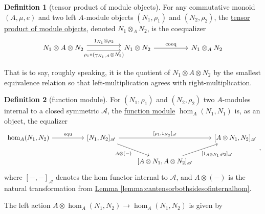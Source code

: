 \documentclass[a4paper,10pt]{scrreprt}
\newcommand{\defn}[1]{\ul{#1}}
\theoremstyle{definition}
\newtheorem{definition}{Definition}[section]
\theoremstyle{plain}
\theoremstyle{remark}
\begin{document}
\begin{definition}[tensor product of module objects]
  \label{def:tensorproductofmoduleobjects}
  For any commutative monoid $(A, \mu, e)$ and two left $A$-module objects $(N_{1}, \rho_{1})$ and $(N_{2}, \rho_{2})$, the \defn{tensor product of module objects}, denoted $N_{1} \otimes_{A} N_{2}$, is the coequalizer
  \begin{equation*}
    \begin{tikzcd}[column sep=huge]
      N_{1} \otimes A \otimes N_{2}
      \arrow[r, shift left=1.5, "1_{N_{1}} \otimes \rho_{2}"]
      \arrow[r, shift right=1.5, swap, "{\rho_{1} \circ (\gamma_{N_{1}, A} \otimes N_{2})}"]
      & N_{1} \otimes N_{2}
      \arrow[r, "\mathrm{coeq}"]
      & N_{1} \otimes_{A} N_{2}
    \end{tikzcd}
  \end{equation*}

  That is to say, roughly speaking, it is the quotient of $N_{1} \otimes A \otimes N_{2}$ by the smallest equivalence relation so that left-multiplication agrees with right-multiplication.
\end{definition}

\begin{definition}[function module]
  \label{def:functionmodule}
  For $(N_{1}, \rho_{1})$ and $(N_{2}, \rho_{2})$ two $A$-modules internal to a closed symmetric $\mathscr{A}$, the \defn{function module} $\hom_{A}(N_{1}, N_{1})$ is, as an object, the equalizer 
  \begin{equation*}
    \begin{tikzcd}
      \hom_{A}(N_{1}, N_{2})
      \arrow[rr, "\mathrm{equ}"]
      & & {[N_{1}, N_{2}]_{\mathscr{A}}}
      \arrow[rr, "{[\rho_{1}, 1_{N_{2}}]_{\mathscr{A}}}"]
      \arrow[dr, swap, "A \otimes (-)"]
      & & {[A \otimes N_{1}, N_{2}]_{\mathscr{A}}}
      \\
      & & & {[A \otimes N_{1}, A \otimes N_{2}]_{\mathscr{A}}}
      \arrow[ur, swap, "{[1_{A \otimes N_{1}}, \rho_2]_{\mathscr{A}}}"]
    \end{tikzcd},
  \end{equation*}
  where $[-,-]_{\mathscr{A}}$ denotes the hom functor internal to $\mathscr{A}$, and $A \otimes (-)$ is the natural transformation from \hyperref[lemma:cantensorbothsidesofinternalhom]{Lemma \ref*{lemma:cantensorbothsidesofinternalhom}}.

  The left action $A \otimes \hom_{A}(N_{1}, N_{2}) \to \hom_{A}(N_{1}, N_{2})$ is given by 
\end{definition}
\end{document}
